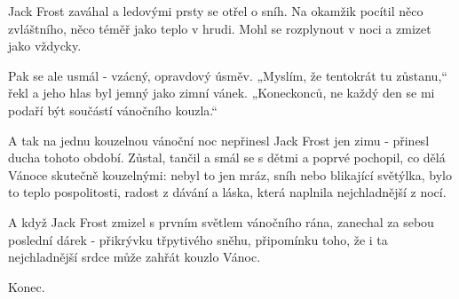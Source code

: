 \documentclass{article}
\begin{document}
Jack Frost zaváhal a ledovými prsty se otřel o sníh. Na okamžik pocítil něco zvláštního, něco téměř jako teplo v hrudi. Mohl se rozplynout v noci a zmizet jako vždycky.

Pak se ale usmál - vzácný, opravdový úsměv. „Myslím, že tentokrát tu zůstanu,“ řekl a jeho hlas byl jemný jako zimní vánek. „Koneckonců, ne každý den se mi podaří být součástí vánočního kouzla.“

A tak na jednu kouzelnou vánoční noc nepřinesl Jack Frost jen zimu - přinesl ducha tohoto období. Zůstal, tančil a smál se s dětmi a poprvé pochopil, co dělá Vánoce skutečně kouzelnými: nebyl to jen mráz, sníh nebo blikající světýlka, bylo to teplo pospolitosti, radost z dávání a láska, která naplnila nejchladnější z nocí.

A když Jack Frost zmizel s prvním světlem vánočního rána, zanechal za sebou poslední dárek - přikrývku třpytivého sněhu, připomínku toho, že i ta nejchladnější srdce může zahřát kouzlo Vánoc.

Konec.
\end{document}
